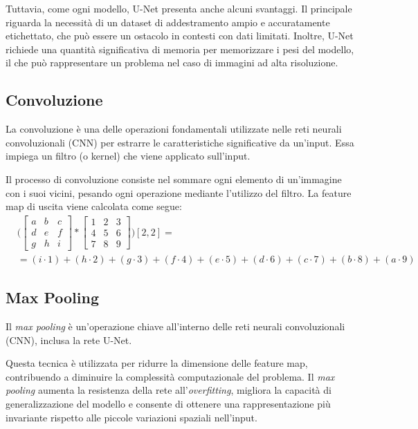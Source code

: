 Tuttavia, come ogni modello, U-Net presenta anche alcuni svantaggi. Il principale riguarda la
necessità di un dataset di addestramento ampio e accuratamente etichettato, che può essere un
ostacolo in contesti con dati limitati. Inoltre, U-Net richiede una quantità significativa di
memoria per memorizzare i pesi del modello, il che può rappresentare un problema nel caso di
immagini ad alta risoluzione.


\subsection{Convoluzione}
\label{sec:convoluzione}

La convoluzione è una delle operazioni fondamentali utilizzate nelle reti neurali convoluzionali
(CNN) per estrarre le caratteristiche significative da un'input. Essa impiega un filtro (o kernel)
che viene applicato sull'input.

Il processo di convoluzione consiste nel sommare ogni elemento di un'immagine con i suoi vicini,
pesando ogni operazione mediante l'utilizzo del filtro. La feature map di uscita viene calcolata
come segue:
\begin{align}
  &\Bigg( \begin{bmatrix}
    a & b & c \\
    d & e & f \\
    g & h & i
  \end{bmatrix}
  *
  \begin{bmatrix}
    1 & 2 & 3 \\
    4 & 5 & 6 \\
    7 & 8 & 9
  \end{bmatrix}
  \Bigg) [2, 2] =\\
  &= (i \cdot 1) + (h \cdot 2) + (g \cdot 3) + (f \cdot 4) + (e \cdot 5) + (d \cdot 6) + (c \cdot 7) + (b \cdot 8) + (a \cdot 9)
\end{align}


\subsection{Max Pooling}
\label{sec:max_pooling}

Il \textit{max pooling} è un'operazione chiave all'interno delle reti neurali convoluzionali (CNN),
inclusa la rete U-Net.

Questa tecnica è utilizzata per ridurre la dimensione delle feature map, contribuendo a diminuire la
complessità computazionale del problema. Il \textit{max pooling} aumenta la resistenza della rete
all'\textit{overfitting}, migliora la capacità di generalizzazione del modello e consente di
ottenere una rappresentazione più invariante rispetto alle piccole variazioni spaziali nell'input.


